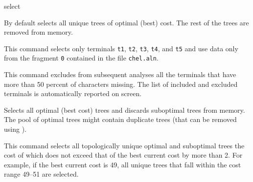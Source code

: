 \begin{command}{select}{}
\begin{arguments}
    \end{arguments}
                          
        {By default \poy selects all unique trees of optimal (best) cost. The rest of
        the trees are removed from memory.}

    \begin{poyexamples}
        
            {This command selects only terminals \texttt{t1},  \texttt{t2},
             \texttt{t3},  \texttt{t4}, and  \texttt{t5} and use data only from the
              fragment  \texttt{0} contained in the file \texttt{chel.aln}.}
    
            {This command excludes from subsequent analyses all the terminals that
            have more than 50 percent of characters missing. The list of included and excluded
            terminals is automatically reported on screen.}
    
            {Selects all optimal (best cost) trees and discards suboptimal trees from
            memory. The pool of optimal trees might contain duplicate trees (that can
            be removed using ).}
            
            {This command selects all topologically unique optimal and suboptimal trees
            the cost of which does not exceed that of the best current cost by more than
            2. For example, if the best current cost is 49, all unique trees that fall within
            the cost range 49--51 are selected.}
    
    \end{poyexamples}

    \begin{poyalso}
    \end{poyalso}

\end{command}



   
